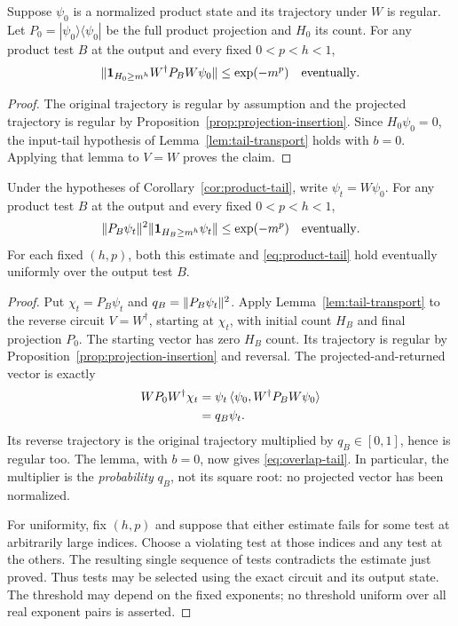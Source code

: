 \begin{corollary}\label{cor:product-tail}
Suppose $\psi_0$ is a normalized product state and its trajectory under
$W$ is regular.  Let $P_0=|\psi_0\rangle\langle\psi_0|$ be the full
product projection and $H_0$ its count.  For any product test $B$ at the
output and every fixed $0<p<h<1$,
\begin{equation}\label{eq:product-tail}
 \lVert\mathbf 1_{H_0\ge m^h}W^{\dagger}P_BW\psi_0\rVert
 \le \exp(-m^p)
 \quad\text{eventually}.
\end{equation}
\end{corollary}

\begin{proof}
The original trajectory is regular by assumption and the projected
trajectory is regular by Proposition~\ref{prop:projection-insertion}.
Since $H_0\psi_0=0$, the input-tail hypothesis of
Lemma~\ref{lem:tail-transport} holds with $b=0$.  Applying that lemma to
$V=W$ proves the claim.
\end{proof}

\begin{corollary}\label{cor:overlap-tail}
Under the hypotheses of Corollary~\ref{cor:product-tail}, write
$\psi_t=W\psi_0$.  For any product test $B$ at the output and every
fixed $0<p<h<1$,
\begin{equation}\label{eq:overlap-tail}
 \lVert P_B\psi_t\rVert^{2}
 \lVert\mathbf 1_{H_B\ge m^h}\psi_t\rVert
 \le \exp(-m^p)
 \quad\text{eventually}.
\end{equation}
For each fixed $(h,p)$, both this estimate and
\eqref{eq:product-tail} hold eventually uniformly over the output test
$B$.
\end{corollary}

\begin{proof}
Put $\chi_t=P_B\psi_t$ and $q_B=\lVert P_B\psi_t\rVert^2$.  Apply
Lemma~\ref{lem:tail-transport} to the reverse circuit $V=W^{\dagger}$,
starting at $\chi_t$, with initial count $H_B$ and final projection
$P_0$.  The starting vector has zero $H_B$ count.  Its trajectory is
regular by Proposition~\ref{prop:projection-insertion} and reversal.
The projected-and-returned vector is exactly
\begin{align*}
 W P_0 W^{\dagger}\chi_t
 &=\psi_t\,\langle \psi_0,W^{\dagger}P_BW\psi_0\rangle\\
 &=q_B\psi_t.
\end{align*}
Its reverse trajectory is the original trajectory multiplied by
$q_B\in[0,1]$, hence is regular too.  The lemma, with $b=0$, now gives
\eqref{eq:overlap-tail}.  In particular, the multiplier is the
\emph{probability} $q_B$, not its square root: no projected vector has
been normalized.

For uniformity, fix $(h,p)$ and suppose that either estimate fails for
some test at arbitrarily large indices.  Choose a violating test at
those indices and any test at the others.  The resulting single
sequence of tests contradicts the estimate just proved.  Thus tests
may be selected using the exact circuit and its output state.  The
threshold may depend on the fixed exponents; no threshold uniform over
all real exponent pairs is asserted.
\end{proof}

